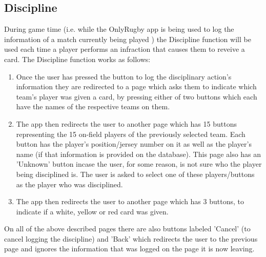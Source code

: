 \documentclass[hidelinks,a4paper,12pt]{article}
\begin{document}
\begin{enumerate}
	\subsection{Discipline}
		During game time (i.e. while the OnlyRugby app is being used to log the information of a match currently being played ) the Discipline function will be used each time a player performs an infraction that causes them to reveive a card. The Discipline function works as follows:
		\begin{enumerate}
			\item Once the user has pressed the button to log the disciplinary action's information they are redirected to a page which asks them to indicate which team's player was given a card, by pressing either of two buttons which each have the names of the respective teams on them.
			\item The app then redirects the user to another page which has 15 buttons representing the 15 on-field players of the previously selected team. Each button has the player's position/jersey number on it as well as the player's name (if that information is provided on the database). This page also has an 'Unknown' button incase the user, for some reason, is not sure who the player being disciplined is. The user is asked to select one of these players/buttons as the player who was disciplined.
			\item The app then redirects the user to another page which has 3 buttons, to indicate if a white, yellow or red card was given.
		\end{enumerate}
	On all of the above described pages there are also buttons labeled 'Cancel' (to cancel logging the discipline) and 'Back' which redirects the user to the previous page and ignores the information that was logged on the page it is now leaving.


\end{enumerate}
\end{document}

